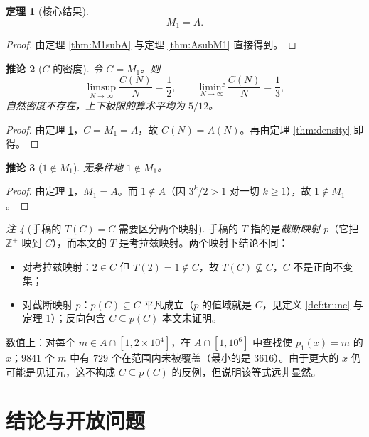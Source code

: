 \documentclass[11pt]{article}
\newtheorem{theorem}{定理}[section]
\newtheorem{corollary}[theorem]{推论}
\theoremstyle{definition}
\theoremstyle{definition}
\theoremstyle{remark}
\newtheorem{remark}[theorem]{注}
\begin{document}
\begin{theorem}[核心结果]\label{thm:M1A}
\[
\boxed{M_1=A}.
\]
\end{theorem}

\begin{proof}
由定理 \ref{thm:M1subA} 与定理 \ref{thm:AsubM1} 直接得到。
\end{proof}

\begin{corollary}[\(C\) 的密度]\label{cor:Cdensity}
令 \(C=M_1\)。则
\[
\limsup_{N\to\infty}\frac{C(N)}{N}=\frac12,\qquad
\liminf_{N\to\infty}\frac{C(N)}{N}=\frac13,
\]
自然密度不存在，上下极限的算术平均为 \(5/12\)。
\end{corollary}

\begin{proof}
由定理 \ref{thm:M1A}，\(C=M_1=A\)，故 \(C(N)=A(N)\)。再由定理 \ref{thm:density} 即得。
\end{proof}

\begin{corollary}[\(1\notin M_1\)]\label{cor:notinM1}
无条件地 \(1\notin M_1\)。
\end{corollary}

\begin{proof}
由定理 \ref{thm:M1A}，\(M_1=A\)。而 \(1\notin A\)（因 \(3^k/2>1\) 对一切 \(k\ge1\)），故 \(1\notin M_1\)。
\end{proof}

\begin{remark}[手稿的 \(T(C)=C\) 需要区分两个映射]\label{rem:TCC}
手稿的 \(T\) 指的是\emph{截断映射} \(p\)（它把 \(\mathbb Z^+\) 映到 \(C\)），而本文的 \(T\) 是考拉兹映射。两个映射下结论不同：
\begin{itemize}
\item 对考拉兹映射：\(2\in C\) 但 \(T(2)=1\notin C\)，故 \(T(C)\not\subseteq C\)，\(C\) 不是正向不变集；
\item 对截断映射 \(p\)：\(p(C)\subseteq C\) 平凡成立（\(p\) 的值域就是 \(C\)，见定义 \ref{def:trunc} 与定理 \ref{thm:M1A}）；反向包含 \(C\subseteq p(C)\) 本文未证明。
\end{itemize}
数值上：对每个 \(m\in A\cap[1,2\times10^4]\)，在 \(A\cap[1,10^6]\) 中查找使 \(p_1(x)=m\) 的 \(x\)；\(9841\) 个 \(m\) 中有 \(729\) 个在范围内未被覆盖（最小的是 \(3616\)）。由于更大的 \(x\) 仍可能是见证元，这不构成 \(C\subseteq p(C)\) 的反例，但说明该等式远非显然。
\end{remark}

\section{结论与开放问题}
\end{document}
